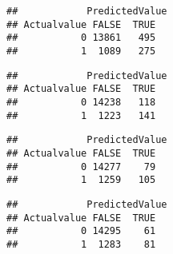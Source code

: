 \documentclass[
]{article}
\newenvironment{Shaded}{\begin{snugshade}}{\end{snugshade}}
\newcommand{\DataTypeTok}[1]{\textcolor[rgb]{0.13,0.29,0.53}{#1}}
\newcommand{\FloatTok}[1]{\textcolor[rgb]{0.00,0.00,0.81}{#1}}
\newcommand{\KeywordTok}[1]{\textcolor[rgb]{0.13,0.29,0.53}{\textbf{#1}}}
\newcommand{\NormalTok}[1]{#1}
\newcommand{\OperatorTok}[1]{\textcolor[rgb]{0.81,0.36,0.00}{\textbf{#1}}}
\begin{document}
\begin{verbatim}
##            PredictedValue
## Actualvalue FALSE  TRUE
##           0 13861   495
##           1  1089   275
\end{verbatim}

\begin{Shaded}
\end{Shaded}

\begin{verbatim}
##            PredictedValue
## Actualvalue FALSE  TRUE
##           0 14238   118
##           1  1223   141
\end{verbatim}

\begin{Shaded}
\end{Shaded}

\begin{verbatim}
##            PredictedValue
## Actualvalue FALSE  TRUE
##           0 14277    79
##           1  1259   105
\end{verbatim}

\begin{Shaded}
\end{Shaded}

\begin{verbatim}
##            PredictedValue
## Actualvalue FALSE  TRUE
##           0 14295    61
##           1  1283    81
\end{verbatim}

\begin{Shaded}
\end{Shaded}
\end{document}
